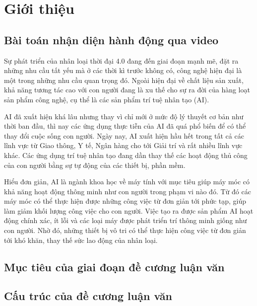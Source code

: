 \section{Giới thiệu}
\subsection{Bài toán nhận diện hành động qua video}
Sự phát triển của nhân loại thời đại 4.0 đang đến giai đoạn mạnh mẽ, đặt
ra những nhu cầu tất yếu mà ở các thời kì trước không có, công nghệ hiện đại
là một trong những nhu cầu quan trọng đó. Ngoài hiện đại về chất liệu sản xuất, khả năng tương tác cao với
con người đang là xu thế cho sự ra đời của hàng loạt sản phẩm công nghệ, cụ thể là các sản phẩm trí tuệ nhân tạo (AI).

AI đã xuất hiện khá lâu nhưng thay vì chỉ mới ở mức độ lý thuyết cơ bản như thời ban đầu, thì nay các ứng dụng
thực tiễn của AI đã quá phổ biến để có thể thay đổi cuộc sống con người. Ngày nay, AI xuất hiện hầu hết trong tất cả các lĩnh
vực từ Giao thông, Y tế, Ngân hàng cho tới Giải trí và rất nhiều lĩnh vực khác. Các ứng dụng trí tuệ nhân tạo đang
dần thay thế các hoạt động thủ công của con người bằng sự tự động của các thiết bị, phần mềm.

Hiểu đơn giản, AI là ngành khoa học về máy tính với mục tiêu giúp máy móc có khả năng hoạt động thông minh như con người trong phạm vi nào đó.
Từ đó các máy móc có thể  thực hiện được những công việc từ đơn giản tới phức tạp, giúp làm giảm khối lượng công việc cho con người.
Việc tạo ra được sản phẩm AI hoạt động chính xác, ít lỗi
và các loại máy được phát triển trí thông minh giống như con người. Nhờ đó, những thiết bị vô tri có thể thực hiện công việc từ đơn giản tới khó khăn, thay thế sức lao động của nhân loại.




\subsection{Mục tiêu của giai đoạn đề cương luận văn}


\subsection{Cấu trúc của đề cương luận văn}

